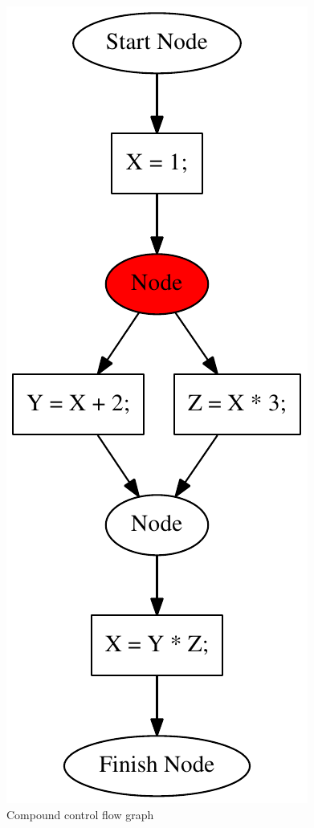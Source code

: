 \documentclass{sig-alternate-05-2015}
\begin{document}
\begin{figure}[h!]
    \begin{center}
        \includegraphics[scale=0.4]{Graphs/cfg_example.pdf}
    \end{center}
    \caption{Compound control flow graph}
    \label{cfg_example}
\end{figure} 
\end{document}
